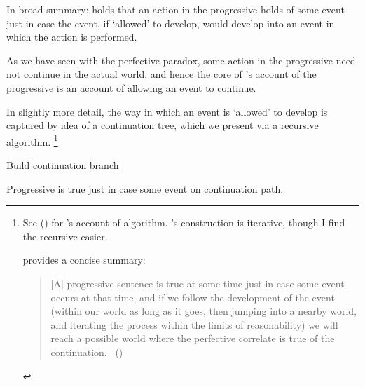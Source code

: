 \begin{note}
  In broad summary:
  \citeauthor{Landman:1992wh} holds that an action in the progressive holds of some event just in case the event, if `allowed' to develop, would develop into an event in which the action is performed.

  As we have seen with the perfective paradox, some action in the progressive need not continue in the actual world, and hence the core of \citeauthor{Landman:1992wh}'s account of the progressive is an account of allowing an event to continue.

  In slightly more detail, the way in which an event is `allowed' to develop is captured by idea of a continuation tree, which we present via a recursive algorithm.
  \footnote{
    See \citeauthor{Landman:1992wh} (\citeyear[26--27]{Landman:1992wh}) for \citeauthor{Landman:1992wh}'s account of algorithm.
    \citeauthor{Landman:1992wh}'s construction is iterative, though I find the recursive easier.

    \textcite{Szabo:2004ul} provides a concise summary:
    \begin{quote}
      [A] progressive sentence is true at some time just in case some event occurs at that time, and if we follow the development of the event (within our world as long as it goes, then jumping into a nearby world, and iterating the process within the limits of reasonability) we will reach a possible world where the perfective correlate is true of the continuation.%
      \mbox{ }\hfill\mbox{(\citeyear[34]{Szabo:2004ul})}
    \end{quote}
  }

  \begin{algorithm}[H]
    \label{PrAl:basic}
    \caption{Build continuation branch}
    \SetAlgoLined
    \DontPrintSemicolon
  \end{algorithm}

  Progressive is true just in case some event on continuation path.
\end{note}

